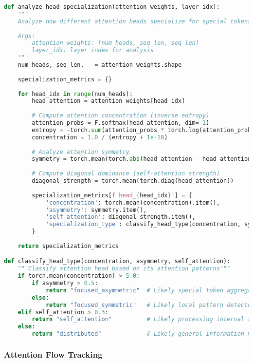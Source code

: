 \begin{lstlisting}[language=Python, caption=Attention head specialization analysis]
def analyze_head_specialization(attention_weights, layer_idx):
    """
    Analyze how different attention heads specialize for special tokens
    
    Args:
        attention_weights: [num_heads, seq_len, seq_len]
        layer_idx: layer index for analysis
    """
    num_heads, seq_len, _ = attention_weights.shape
    
    specialization_metrics = {}
    
    for head_idx in range(num_heads):
        head_attention = attention_weights[head_idx]
        
        # Compute attention concentration (inverse entropy)
        attention_probs = F.softmax(head_attention, dim=-1)
        entropy = -torch.sum(attention_probs * torch.log(attention_probs + 1e-10), dim=-1)
        concentration = 1.0 / (entropy + 1e-10)
        
        # Analyze attention symmetry
        symmetry = torch.mean(torch.abs(head_attention - head_attention.T))
        
        # Compute diagonal dominance (self-attention strength)
        diagonal_strength = torch.mean(torch.diag(head_attention))
        
        specialization_metrics[f'head_{head_idx}'] = {
            'concentration': torch.mean(concentration).item(),
            'asymmetry': symmetry.item(),
            'self_attention': diagonal_strength.item(),
            'specialization_type': classify_head_type(concentration, symmetry, diagonal_strength)
        }
    
    return specialization_metrics

def classify_head_type(concentration, asymmetry, self_attention):
    """Classify attention head based on its attention patterns"""
    if torch.mean(concentration) > 5.0:
        if asymmetry > 0.5:
            return "focused_asymmetric"  # Likely special token aggregator
        else:
            return "focused_symmetric"   # Likely local pattern detector
    elif self_attention > 0.3:
        return "self_attention"          # Likely processing internal representations
    else:
        return "distributed"             # Likely general information mixing
\end{lstlisting}

\subsubsection{Attention Flow Tracking}

